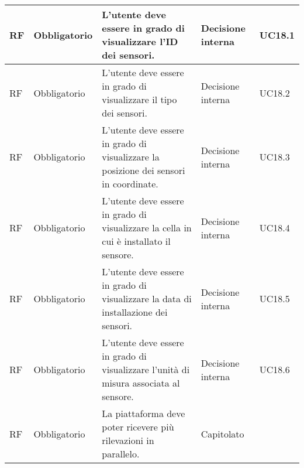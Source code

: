 \begin{longtable}{|C{1.5cm}|C{2cm}|L{5cm}|C{2cm}|C{1.5cm}|}
    \hline
     RF & Obbligatorio & L'utente deve essere in grado di visualizzare l'ID dei sensori. & Decisione interna  & UC18.1 \\

    \hline
     RF & Obbligatorio & L'utente deve essere in grado di visualizzare il tipo dei sensori. & Decisione interna & UC18.2 \\

    \hline
     RF & Obbligatorio & L'utente deve essere in grado di visualizzare la posizione dei sensori in coordinate. & Decisione interna & UC18.3 \\

    \hline
     RF & Obbligatorio & L'utente deve essere in grado di visualizzare la cella in cui è installato il sensore. & Decisione interna & UC18.4 \\

    \hline
     RF & Obbligatorio & L'utente deve essere in grado di visualizzare la data di installazione dei sensori. & Decisione interna & UC18.5 \\

    \hline
     RF & Obbligatorio & L'utente deve essere in grado di visualizzare l'unità di misura associata al sensore. & Decisione interna & UC18.6 \\
    
    \hline
     RF & Obbligatorio & La piattaforma deve poter ricevere più rilevazioni in parallelo. & Capitolato &  \\

    \hline
    
\end{longtable}

